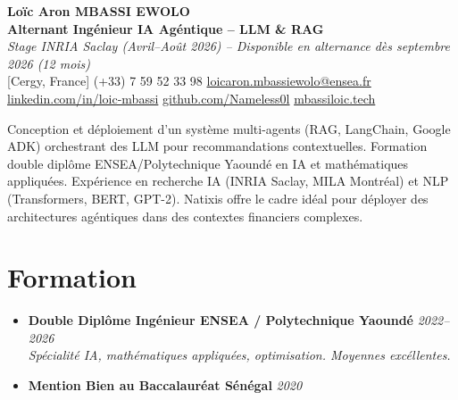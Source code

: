 \documentclass[a4paper,11pt]{article}
\begin{document}
\begin{center}
    {\Large \textbf{Lo\"ic Aron MBASSI EWOLO}} \\ \vspace{4pt}
    \textbf{\large Alternant Ing\'enieur IA Ag\'entique -- LLM \& RAG} \\
    \textit{\small Stage INRIA Saclay (Avril--Ao\^ut 2026) -- Disponible en alternance d\`es septembre 2026 (12 mois)} \\ \vspace{4pt}
    \small
    [Cergy, France] \quad
    (+33) 7 59 52 33 98 \quad
    {\color{primary}\href{mailto:loicaron.mbassiewolo@ensea.fr}{loicaron.mbassiewolo@ensea.fr}} \\ \vspace{2pt}
    {\color{primary}\href{https://www.linkedin.com/in/loic-mbassi/}{linkedin.com/in/loic-mbassi}} \quad
    {\color{primary}\href{https://github.com/Nameless0l}{github.com/Nameless0l}} \quad
    {\color{primary}\href{https://mbassiloic.tech}{mbassiloic.tech}}
\end{center}
\vspace{-6pt}
\noindent\small{Conception et d\'eploiement d'un syst\`eme multi-agents (RAG, LangChain, Google ADK) orchestrant des LLM pour recommandations contextuelles. Formation double dipl\^ome ENSEA/Polytechnique Yaound\'e en IA et math\'ematiques appliqu\'ees. Exp\'erience en recherche IA (INRIA Saclay, MILA Montr\'eal) et NLP (Transformers, BERT, GPT-2). Natixis offre le cadre id\'eal pour d\'eployer des architectures ag\'entiques dans des contextes financiers complexes.}

\section{Formation}
\begin{itemize}[leftmargin=0.5cm, nosep]
    \item \textbf{Double Dipl\^ome Ing\'enieur ENSEA / Polytechnique Yaound\'e} \hfill \textit{2022--2026} \\
    \textit{Sp\'ecialit\'e IA, math\'ematiques appliqu\'ees, optimisation. Moyennes exc\'ellentes.}
    \item \textbf{Mention Bien au Baccalaur\'eat S\'en\'egal} \hfill \textit{2020}
\end{itemize}
\end{document}
